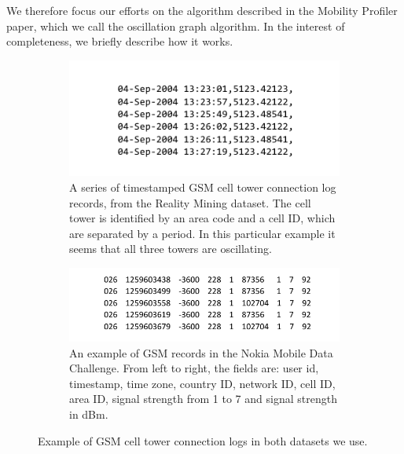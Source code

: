 \documentclass[letterpaper, 12pt, conference]{ieeeconf}
\begin{document}
We therefore focus our efforts on the algorithm described in the Mobility 
Profiler paper, which we call the oscillation graph algorithm. In the 
interest of completeness, we briefly describe how it works.

\begin{figure}
        \centering
        \begin{subfigure}[t]{0.44\textwidth}
                \centering
                \includegraphics[width=\textwidth]{figs/gsm_log_rm}
                \caption{A series of timestamped GSM cell tower connection 
log records, from the Reality Mining dataset. The cell tower is identified by 
an area code and a cell ID, which are separated by a period. In this 
particular example it seems that all three towers are oscillating.}
                \label{fig:gsm_log_example}
        \end{subfigure}%
        \qquad %
        \begin{subfigure}[t]{0.48\textwidth}
                \centering
                \includegraphics[width=\textwidth]{figs/gsm_log_mdc}
                \caption{An example of GSM records in the Nokia Mobile Data 
Challenge. From left to right, the fields are: user id, timestamp, time zone, 
country ID, network ID, cell ID, area ID, signal strength from 1 to 7 and 
signal strength in dBm.}
			\label{fig:gsm_log_mdc}
        \end{subfigure}
				\caption{Example of GSM cell tower connection logs in both datasets 
we use.}
\end{figure}
\end{document}
